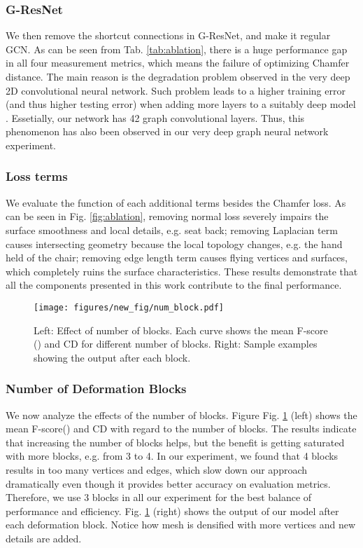 \documentclass[runningheads]{llncs}
\newcommand{\figref}[1]{Fig. \ref{#1}}
\newcommand{\tabref}[1]{Tab. \ref{#1}}
\begin{document}
\subsubsection{G-ResNet}
We then remove the shortcut connections in G-ResNet, and make it regular GCN. As can be seen from \tabref{tab:ablation}, there is a huge performance gap in all four measurement metrics, which means the failure of optimizing Chamfer distance. The main reason is the degradation problem observed in the very deep 2D convolutional neural network. Such problem leads to a higher training error (and thus higher testing error) when adding more layers to a suitably deep model \cite{HeZRS16}. Essetially, our network has 42 graph convolutional layers. Thus, this phenomenon has also been observed in our very deep graph neural network experiment.

\subsubsection{Loss terms}
We evaluate the function of each additional terms besides the Chamfer loss. As can be seen in \figref{fig:ablation}, removing normal loss severely impairs the surface smoothness and local details, e.g. seat back; removing Laplacian term causes intersecting geometry because the local topology changes, e.g. the hand held of the chair; removing edge length term causes flying vertices and surfaces, which completely ruins the surface characteristics.
These results demonstrate that all the components presented in this work contribute to the final performance.









\begin{figure}[tbhp]
\centering
\texttt{[image: figures/new\_fig/num\_block.pdf]}
\caption{Left: Effect of number of blocks. Each curve shows the mean F-score () and CD for different number of blocks. Right: Sample examples showing the output after each block.}
\label{fig:num_block}
\end{figure} 

\subsubsection{Number of Deformation Blocks}
We now analyze the effects of the number of blocks. Figure \figref{fig:num_block} (left) shows the mean F-score() and CD with regard to the number of blocks. The results indicate that increasing the number of blocks helps, but the benefit is getting saturated with more blocks, e.g. from 3 to 4. In our experiment, we found that 4 blocks results in too many vertices and edges, which slow down our approach dramatically even though it provides better accuracy on evaluation metrics. Therefore, we use 3 blocks in all our experiment for the best balance of performance and efficiency. 
\figref{fig:num_block} (right) shows the output of our model after each deformation block. Notice how mesh is densified with more vertices and new details are added.
\end{document}
